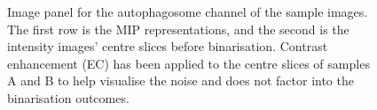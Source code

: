 \begin{figure}[ht!]
	\caption[Image panel of the autophagosome sample intensity images used in binarisation.]{Image panel for the autophagosome channel of the sample images. The first row is the MIP representations, and the second is the intensity images' centre slices before binarisation. Contrast enhancement (EC) has been applied to the centre slices of samples A and B to help visualise the noise and does not factor into the binarisation outcomes.}
	\label{fig:autophagosome_raw}
\end{figure}

\FloatBarrier
